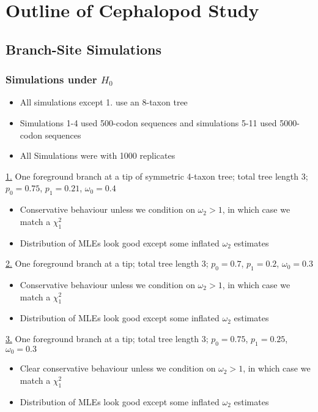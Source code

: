 \documentclass[11pt]{article}
\author{Joseph Mingrone}
\date{\today}
\title{}
\begin{document}
\tableofcontents

\section{Outline of Cephalopod Study}
\label{sec:orgd31c6fc}
\subsection{Branch-Site Simulations}
\label{sec:org9701120}
\subsubsection{Simulations under \(H_0\)}
\label{sec:orgf649161}
\begin{itemize}
\item All simulations except 1. use an 8-taxon tree
\item Simulations 1-4 used 500-codon sequences and simulations 5-11 used
5000-codon sequences
\item All Simulations were with 1000 replicates
\end{itemize}

\href{https://ftfl.ca/misc/bsa/bsa\_sim1\_4-taxon-tree.pdf}{1.} One foreground branch at a tip of symmetric 4-taxon tree; total tree
length 3; \(p_0=0.75\), \(p_1=0.21\), \(\omega_0=0.4\)
\begin{itemize}
\item Conservative behaviour unless we condition on \(\omega_2>1\), in which case
we match a \(\chi^2_1\)
\item Distribution of MLEs look good except some inflated \(\omega_2\) estimates
\end{itemize}

\href{https://ftfl.ca/misc/bsa/bsa\_sim2\_8-taxon-tree.pdf}{2.} One foreground branch at a tip; total tree length 3; \(p_0=0.7\),
\(p_1=0.2\), \(\omega_0=0.3\)
\begin{itemize}
\item Conservative behaviour unless we condition on \(\omega_2>1\), in which case
we match a \(\chi^2_1\)
\item Distribution of MLEs look good except some inflated \(\omega_2\) estimates
\end{itemize}

\href{https://ftfl.ca/misc/bsa/bsa\_sim3\_8-taxon-tree.pdf}{3.} One foreground branch at a tip; total tree length 3; \(p_0=0.75\),
\(p_1=0.25\), \(\omega_0=0.3\)
\begin{itemize}
\item Clear conservative behaviour unless we condition on \(\omega_2>1\), in which
case we match a \(\chi^2_1\)
\item Distribution of MLEs look good except some inflated \(\omega_2\) estimates
\end{itemize}
\end{document}

